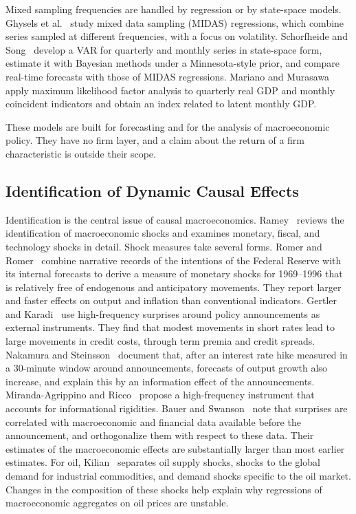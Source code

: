   Mixed sampling frequencies are handled by regression or by state-space
  models. Ghysels et al.~\cite{ghysels2007midas} study mixed data sampling (MIDAS) regressions,
  which combine series sampled at different frequencies, with a focus on
  volatility. Schorfheide and Song~\cite{schorfheide2015real} develop a VAR for quarterly and monthly
  series in state-space form, estimate it with Bayesian methods under a
  Minnesota-style prior, and compare real-time forecasts with those of MIDAS
  regressions. Mariano and Murasawa~\cite{mariano2003new} apply maximum likelihood factor analysis to
  quarterly real GDP and monthly coincident indicators and obtain an index
  related to latent monthly GDP.

  These models are built for forecasting and for the analysis of macroeconomic
  policy. They have no firm layer, and a claim about the return of a firm
  characteristic is outside their scope.

  \subsection{Identification of Dynamic Causal Effects}\label{sec:sota_identification}

  Identification is the central issue of causal macroeconomics.
  Ramey~\cite{ramey2016macroeconomic} reviews the identification of macroeconomic
  shocks and examines monetary, fiscal, and technology shocks in detail. Shock
  measures take several forms. Romer and Romer~\cite{romer2004new} combine narrative records of
  the intentions of the Federal Reserve with its internal forecasts to derive a
  measure of monetary shocks for 1969--1996 that is relatively free of
  endogenous and anticipatory movements. They report larger and faster effects
  on output and inflation than conventional indicators.
  Gertler and Karadi~\cite{gertler2015monetary} use high-frequency surprises around policy
  announcements as external instruments. They find that modest movements in
  short rates lead to large movements in credit costs, through term premia and
  credit spreads. Nakamura and Steinsson~\cite{nakamura2018high} document that, after an interest rate
  hike measured in a 30-minute window around announcements, forecasts of output
  growth also increase, and explain this by an information effect of the
  announcements. Miranda-Agrippino and Ricco~\cite{miranda2021transmission} propose a high-frequency
  instrument that accounts for informational rigidities.
  Bauer and Swanson~\cite{bauer2023reassessment} note that surprises are correlated with
  macroeconomic and financial data available before the announcement, and
  orthogonalize them with respect to these data. Their estimates of the
  macroeconomic effects are substantially larger than most earlier estimates.
  For oil, Kilian~\cite{kilian2009oil} separates oil supply shocks, shocks to the
  global demand for industrial commodities, and demand shocks specific to the
  oil market. Changes in the composition of these shocks help explain why
  regressions of macroeconomic aggregates on oil prices are unstable.

